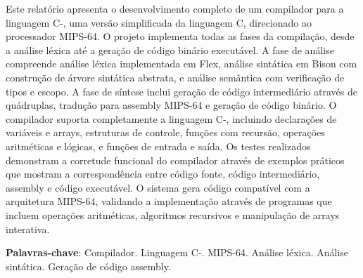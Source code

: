 \documentclass[
	12pt,				%
	oneside,
	a4paper,			%
	english,			%
	french,				%
	spanish,			%
	brazil,				%
	]{abntex2}
\begin{document}

\frenchspacing 


\imprimircapa

\imprimirfolhaderosto*

\setlength{\absparsep}{18pt}
\begin{resumo}

Este relatório apresenta o desenvolvimento completo de um compilador para a linguagem C-, uma versão simplificada da linguagem C, direcionado ao processador MIPS-64. O projeto implementa todas as fases da compilação, desde a análise léxica até a geração de código binário executável. A fase de análise compreende análise léxica implementada em Flex, análise sintática em Bison com construção de árvore sintática abstrata, e análise semântica com verificação de tipos e escopo. A fase de síntese inclui geração de código intermediário através de quádruplas, tradução para assembly MIPS-64 e geração de código binário. O compilador suporta completamente a linguagem C-, incluindo declarações de variáveis e arrays, estruturas de controle, funções com recursão, operações aritméticas e lógicas, e funções de entrada e saída. Os testes realizados demonstram a corretude funcional do compilador através de exemplos práticos que mostram a correspondência entre código fonte, código intermediário, assembly e código executável. O sistema gera código compatível com a arquitetura MIPS-64, validando a implementação através de programas que incluem operações aritméticas, algoritmos recursivos e manipulação de arrays interativa.

\noindent
\textbf{Palavras-chave}: Compilador. Linguagem C-. MIPS-64. Análise léxica. Análise sintática. Geração de código assembly.
\end{resumo}

\listoffigures*
\clearpage

\listoftables*
\clearpage

\tableofcontents*
\end{document}
